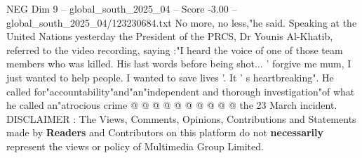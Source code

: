 \begin{textsample}{NEG Dim 9 – global\_south\_2025\_04 – Score -3.00 – global\_south\_2025\_04/123230684.txt}
No more, no less,"he said.
Speaking at the United Nations yesterday the President of the PRCS, Dr Younis Al-Khatib, referred to the video recording, saying :"I heard the voice of one of those team members who was killed.
His last words before being shot... ' forgive me mum, I just wanted to help people.
I wanted to save lives '.
It ' s heartbreaking".
He called for"accountability"and"an"independent and thorough investigation"of what he called an"atrocious crime @ @ @ @ @ @ @ @ @ @ the 23 March incident.
DISCLAIMER : The Views, Comments, Opinions, Contributions and Statements made by \textbf{Readers} and Contributors on this platform do not \textbf{necessarily} represent the views or policy of Multimedia Group Limited.

\end{textsample}
